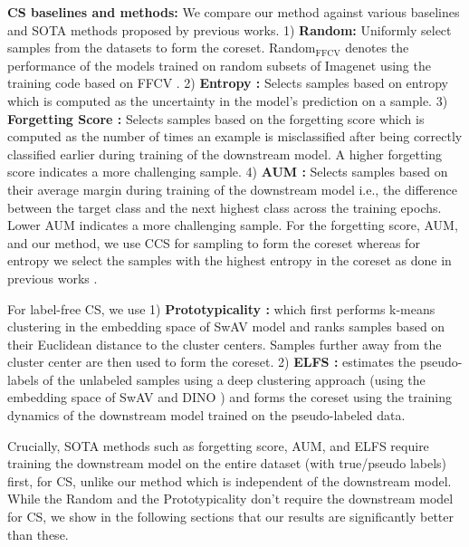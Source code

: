 {\bf CS baselines and methods:}
We compare our method against various baselines and SOTA methods proposed by previous works. 
1) {\bf Random:} Uniformly select samples from the datasets to form the coreset. Random$_{\mathrm{FFCV}}$ denotes the performance of the models trained on random subsets of Imagenet using the training code based on FFCV \cite{leclerc2023ffcv}.
2) {\bf Entropy \cite{coleman2019selection}:} Selects samples based on entropy which is computed as the uncertainty in the model's prediction on a sample.
3) {\bf Forgetting Score \cite{toneva2018empirical}:} Selects samples based on the forgetting score which is computed as the number of times an example is misclassified after being correctly classified earlier during training of the downstream model. A higher forgetting score indicates a more challenging sample.
4) {\bf AUM \cite{pleiss2020identifying}:} Selects samples based on their average margin during training of the downstream model i.e., the difference between the target class and the next highest class across the training epochs. Lower AUM indicates a more challenging sample. 
For the forgetting score, AUM, and our method, we use CCS \cite{zheng2022coverage} for sampling to form the coreset whereas for entropy we select the samples with the highest entropy in the coreset as done in previous works \cite{coleman2019selection,zheng2022coverage}.

For label-free CS, we use 
1) {\bf Prototypicality \cite{sorscher2022beyond}:} which first performs k-means clustering in the embedding space of SwAV \cite{caron2020unsupervised} model and ranks samples based on their Euclidean distance to the cluster centers. 
Samples further away from the cluster center are then used to form the coreset. 
2) {\bf ELFS \cite{zheng2024elfs}:} estimates the pseudo-labels of the unlabeled samples using a deep clustering approach (using the embedding space of SwAV \cite{caron2020unsupervised} and DINO \cite{caron2021emerging}) and forms the coreset using the training dynamics of the downstream model trained on the pseudo-labeled data. 

Crucially, SOTA methods such as forgetting score, AUM, and ELFS require training the downstream model on the entire dataset (with true/pseudo labels) first, for CS, unlike our method which is independent of the downstream model. 
While the Random and the Prototypicality don't require the downstream model for CS, we show in the following sections that our results are significantly better than these.


